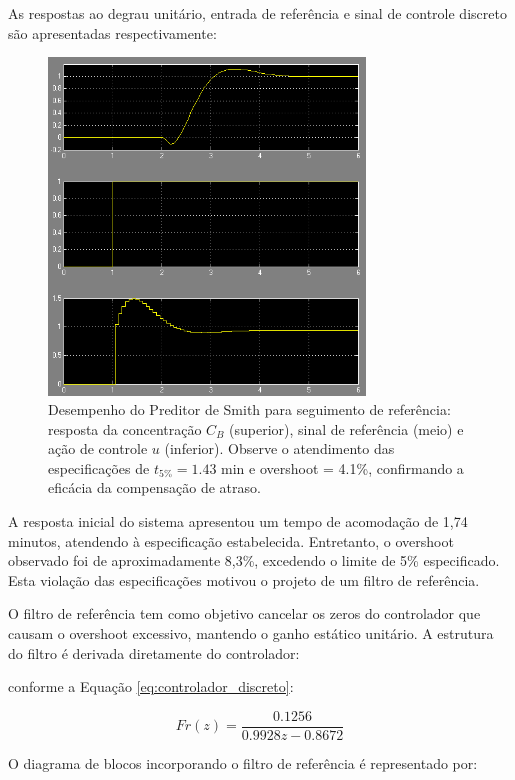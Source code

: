 \documentclass[a4paper,12pt]{article}
\begin{document}
As respostas ao degrau unitário, entrada de referência e sinal de controle discreto são apresentadas respectivamente:

   \begin{figure}[H]
  \centering
  \includegraphics[width=0.75\textwidth]{Imagens/q12.png}
  \caption{Desempenho do Preditor de Smith para seguimento de referência: resposta da concentração $C_B$ (superior), sinal de referência (meio) e ação de controle $u$ (inferior). Observe o atendimento das especificações de $t_{5\%} = 1.43$ min e overshoot = 4.1\%, confirmando a eficácia da compensação de atraso.}
  \end{figure}

A resposta inicial do sistema apresentou um tempo de acomodação de 1,74 minutos, atendendo à especificação estabelecida. Entretanto, o overshoot observado foi de aproximadamente 8,3\%, excedendo o limite de 5\% especificado. Esta violação das especificações motivou o projeto de um filtro de referência.

O filtro de referência tem como objetivo cancelar os zeros do controlador que causam o overshoot excessivo, mantendo o ganho estático unitário. A estrutura do filtro é derivada diretamente do controlador:

  conforme a Equação \ref{eq:controlador_discreto}:

\begin{equation}
Fr(z) = \frac{0.1256}{0.9928z-0.8672}
\label{eq:filtro_referencia}
\end{equation}

  O diagrama de blocos incorporando o filtro de referência é representado por:
\end{document}
